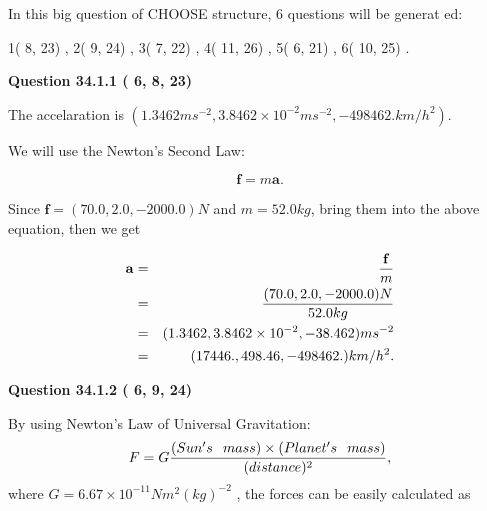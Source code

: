 \documentclass[12pt]{article}
\begin{document}
   
\vspace{0.2in}
   
 In this big question of CHOOSE structure,           6 questions will be generat
 ed: 
  
  
            1(          8,         23)
 ,
            2(          9,         24)
 ,
            3(          7,         22)
 ,
            4(         11,         26)
 ,
            5(          6,         21)
 ,
            6(         10,         25)
 .
  
\vspace{0.2in}
  
{\textbf{\Large{Question
34.1.1 
 (          6,          8,         23)
}}}
  
  
 
 
\noindent{}
 
 
The accelaration is
$(
1.3462ms^{-2},
3.8462 \times 10^{-2}ms^{-2},
-498462.km/h^2
).
$
 
 
 
 
 
 
\noindent{}

We will use the Newton's Second Law:
 
\[
\mathbf{f}=m\mathbf{a}.
\]
 
Since $\mathbf{f}=( %
70.0,  %
2.0,  %
-2000.0 )N$
and $m= %
52.0kg$, bring them into the above equation, then we get
 
\begin{eqnarray*}
\mathbf{a}&=&\frac{\mathbf{f}}m  \\
&=&\frac{(
70.0 ,
2.0 ,
-2000.0 )N
}{ %
52.0 kg}  \\
&=&(
1.3462 ,
3.8462 \times 10^{-2},
-38.462
)ms^{-2} \\
&=&(
17446. ,
498.46 ,
-498462.
)km/h^2.
\end{eqnarray*}
 
 
 
  
\vspace{0.2in}
  
{\textbf{\Large{Question
34.1.2 
 (          6,          9,         24)
}}}
  
  
 
 
\noindent{}

By using Newton's Law of Universal Gravitation:
\[
F=G \frac{(Sun's \hspace{0.1in} mass) \times (Planet's \hspace{0.1in} mass)} { (distance)^2},
\]
where
$ G= %
6.67 \times 10^{-11}N m^{2}(kg)^{-2}$ , the forces can be easily calculated as
 
\end{document}
